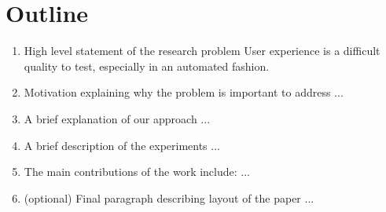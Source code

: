 \section{Outline}

\begin{enumerate}
   \item High level statement of the research problem
   User experience is a difficult quality to test, especially in
   an automated fashion.

   \item Motivation explaining why the problem is important to address
   ...

   \item A brief explanation of our approach
   ...

   \item A brief description of the experiments
   ...

   \item The main contributions of the work include:
   ...

   \item (optional) Final paragraph describing layout of the paper
   ...

\end{enumerate}
